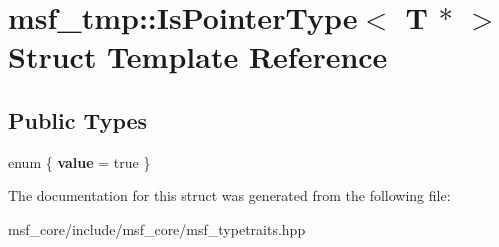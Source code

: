 \hypertarget{structmsf__tmp_1_1IsPointerType_3_01T_01_5_01_4}{\section{msf\-\_\-tmp\-:\-:Is\-Pointer\-Type$<$ T $\ast$ $>$ Struct Template Reference}
\label{structmsf__tmp_1_1IsPointerType_3_01T_01_5_01_4}
}
\subsection*{Public Types}
\begin{DoxyCompactItemize}
\item 
enum \{ {\bfseries value} =  true
 \}
\end{DoxyCompactItemize}


The documentation for this struct was generated from the following file\-:\begin{DoxyCompactItemize}
\item 
msf\-\_\-core/include/msf\-\_\-core/msf\-\_\-typetraits.\-hpp\end{DoxyCompactItemize}

